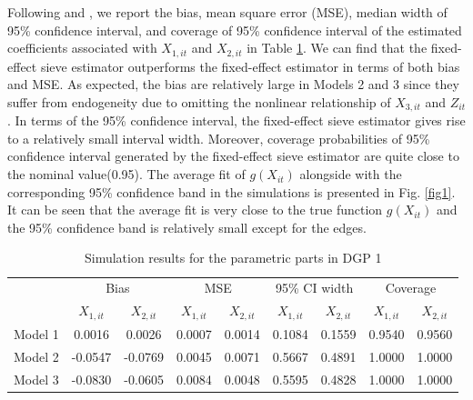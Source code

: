 Following \citet{sim2006} and \citet{white2010simsum}, we report the bias, mean square error (MSE), median width of 95\% confidence interval, and coverage of 95\% confidence interval of the estimated coefficients associated with $X_{1,it}$ and $X_{2,it}$ in Table \ref{tab1}. We can find that the fixed-effect sieve estimator outperforms the fixed-effect estimator in terms of both bias and MSE. As expected, the bias are relatively large in Models 2 and 3 since they suffer from endogeneity due to omitting the nonlinear relationship of $X_{3,it}$ and $Z_{it}$. In terms of the 95\% confidence interval, the fixed-effect sieve estimator gives rise to a relatively small interval width. Moreover, coverage probabilities of 95\% confidence interval generated by the fixed-effect sieve estimator are quite close to the nominal value(0.95). The average fit of $g(X_{it})$ alongside with the corresponding 95\% confidence band in the simulations is presented in Fig. \ref{fig1}. It can be seen that the average fit is very close to the true function $g(X_{it})$ and the 95\% confidence band is relatively small except for the edges.


\begin{table}[htbp]
	
	\scriptsize
	
	\centering
	
	\caption{Simulation results for the parametric parts in DGP 1}
	
	\label{Tab03}
	
	\begin{tabular}{ccccccccc}
		
		\toprule
		
		\multirow{1}{*}{} & \multicolumn{2}{c}{Bias} & \multicolumn{2}{c}{MSE} & \multicolumn{2}{c}{95\% CI width}& \multicolumn{2}{c}{Coverage} \\
		
		\cmidrule(r){2-3} \cmidrule(r){4-5} \cmidrule(r){6-7} \cmidrule(r){8-9}
		
		&  $X_{1,it}$      &  $X_{2,it}$   &  $X_{1,it}$      &  $X_{2,it}$  & $X_{1,it}$      &  $X_{2,it}$ & $X_{1,it}$      &  $X_{2,it}$  \\
		
		\midrule
		
		Model 1 &    0.0016 &    0.0026 &    0.0007 &    0.0014 &    0.1084 &    0.1559 &    0.9540 &    0.9560 \\ 
		Model 2 &   -0.0547 &   -0.0769 &    0.0045 &    0.0071 &    0.5667 &    0.4891 &    1.0000 &    1.0000 \\ 
		Model 3 &   -0.0830 &   -0.0605 &    0.0084 &    0.0048 &    0.5595 &    0.4828 &    1.0000 &    1.0000 \\ 
		
		\bottomrule
		
	\end{tabular}
	\label{tab1}	
\end{table}



